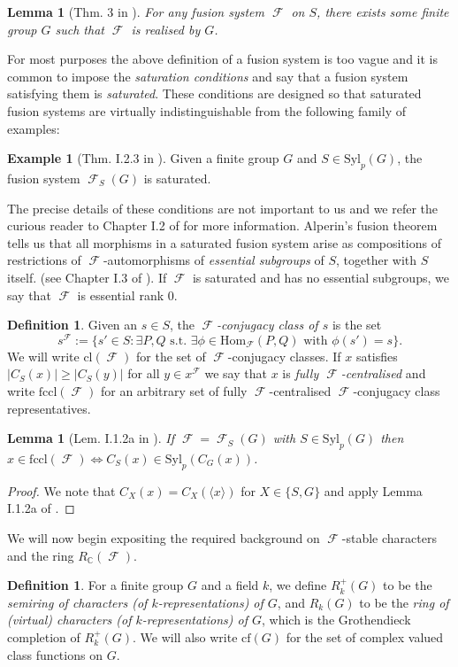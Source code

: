 \documentclass[12pt]{article}
\DeclareMathOperator{\C}{\mathbb{C}}
\DeclareMathOperator{\sF}{\mathcal{F}}
\theoremstyle{plain}
\newtheorem{lem}[thm]{Lemma}
\theoremstyle{definition}
\newtheorem{defn}[thm]{Definition}
\newtheorem{example}[thm]{Example}
\begin{document}
\begin{lem}[Thm. 3 in \cite{realising}]\label{generating group existence}
For any fusion system $\sF$ on $S$, there exists some finite group $G$ such that $\sF$ is realised by $G$.
\end{lem}


For most purposes the above definition of a fusion system is too vague and it is common to impose the \emph{saturation conditions} and say that a fusion system satisfying them is \emph{saturated}. These conditions are designed so that saturated fusion systems are virtually indistinguishable from the following family of examples: 
\begin{example}[Thm. I.2.3 in \cite{AKO}]
Given a finite group $G$ and $S \in \text{Syl}_p(G)$, the fusion system $\sF_S(G)$ is saturated.
\end{example}
The precise details of these conditions are not important to us and we refer the curious reader to Chapter I.2 of \cite{AKO} for more information. Alperin's fusion theorem tells us that all morphisms in a saturated fusion system arise as compositions of restrictions of $\sF$-automorphisms of \emph{essential subgroups} of $S$, together with $S$ itself. (see Chapter I.3 of \cite{AKO}). If $\sF$ is saturated and has no essential subgroups, we say that $\sF$ is essential rank $0$. 


\begin{defn}Given an $s \in S$, the \emph{$\sF$-conjugacy class of $s$} is the set 
\[s^{\sF} := \{s' \in S \colon \exists P, Q \text{ s.t. } \exists \phi \in \mathrm{Hom}_{\sF}(P, Q) \text{ with } \phi(s') = s\}.\]
We will write $\text{cl}(\sF)$ for the set of $\sF$-conjugacy classes. If $x$ satisfies $|C_S(x)| \geq |C_S(y)|$ for all $y \in x^{\sF}$ we say that $x$ is \emph{fully $\sF$-centralised} and write $\text{fccl}(\sF)$ for an arbitrary set of fully $\sF$-centralised $\sF$-conjugacy class representatives.
\end{defn}
\begin{lem}[Lem. I.1.2a in \cite{AKO}]\label{fccl sylow}
If $\sF = \sF_S(G)$ with $S \in \text{Syl}_p(G)$ then $x \in \text{fccl}(\sF) \iff C_S(x) \in \text{Syl}_p(C_G(x))$.
\end{lem}
\begin{proof}
We note that $C_X(x) = C_X(\langle x \rangle)$ for $X \in \{S, G\}$ and apply Lemma I.1.2a of \cite{AKO}.
\end{proof}


We will now begin expositing the required background on $\sF$-stable characters and the ring $R_{\C}(\sF)$.
\begin{defn} 
For a finite group $G$ and a field $k$, we define $R_k^+(G)$ to be the \emph{semiring of characters (of $k$-representations) of $G$}, and $R_{k}(G)$ to be the \emph{ring of (virtual) characters (of $k$-representations) of $G$}, which is the Grothendieck completion of $R_k^+(G)$. We will also write $\text{cf}(G)$ for the set of complex valued class functions on $G$.
\end{defn}
\end{document}
